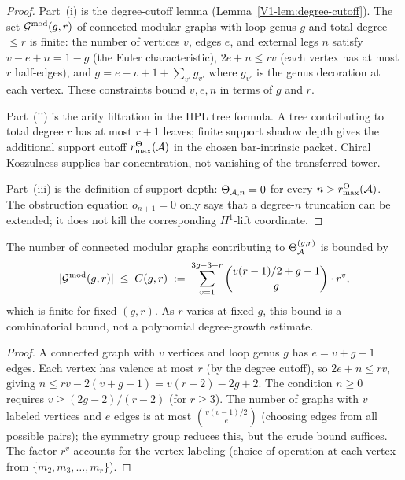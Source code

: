 \begin{proof}
Part~(i) is the degree-cutoff lemma (Lemma~\ref{V1-lem:degree-cutoff}). The set $\mathcal{G}^{\mathrm{mod}}(g,r)$ of connected modular graphs with loop genus $g$ and total degree $\leq r$ is finite: the number of vertices $v$, edges $e$, and external legs $n$ satisfy $v - e + n = 1 - g$ (the Euler characteristic), $2e + n \leq rv$ (each vertex has at most $r$ half-edges), and $g = e - v + 1 + \sum_{v'} g_{v'}$ where $g_{v'}$ is the genus decoration at each vertex. These constraints bound $v, e, n$ in terms of $g$ and $r$.

Part~(ii) is the arity filtration in the HPL tree formula. A tree contributing to total degree $r$ has at most $r+1$ leaves; finite support shadow depth gives the additional support cutoff \(r^\Theta_{\max}(\mathcal{A})\) in the chosen bar-intrinsic packet. Chiral Koszulness supplies bar concentration, not vanishing of the transferred tower.

Part~(iii) is the definition of support depth: \(\Theta_{\mathcal{A},n}=0\) for every \(n>r^\Theta_{\max}(\mathcal{A})\).  The obstruction equation \(o_{n+1}=0\) only says that a degree-\(n\) truncation can be extended; it does not kill the corresponding \(H^1\)-lift coordinate.
\end{proof}

\begin{proposition}
\label{prop:thqg-I-graph-count}
The number of connected modular graphs contributing to $\Theta_{\mathcal{A}}^{(g,r)}$ is bounded by
\begin{equation}%
|\Gmod(g,r)| \;\leq\; C(g,r) \;:=\; \sum_{v=1}^{3g-3+r} \binom{v(r-1)/2 + g - 1}{g} \cdot r^v,
\end{equation}
which is finite for fixed $(g,r)$. As $r$ varies at fixed $g$, this
bound is a combinatorial bound, not a polynomial degree-growth
estimate.
\end{proposition}

\begin{proof}
A connected graph with $v$ vertices and loop genus $g$ has $e = v + g - 1$ edges. Each vertex has valence at most $r$ (by the degree cutoff), so $2e + n \leq rv$, giving $n \leq rv - 2(v+g-1) = v(r-2) - 2g + 2$. The condition $n \geq 0$ requires $v \geq (2g-2)/(r-2)$ (for $r \geq 3$). The number of graphs with $v$ labeled vertices and $e$ edges is at most $\binom{v(v-1)/2}{e}$ (choosing edges from all possible pairs); the symmetry group reduces this, but the crude bound suffices. The factor $r^v$ accounts for the vertex labeling (choice of operation at each vertex from $\{m_2, m_3, \ldots, m_r\}$).
\end{proof}


